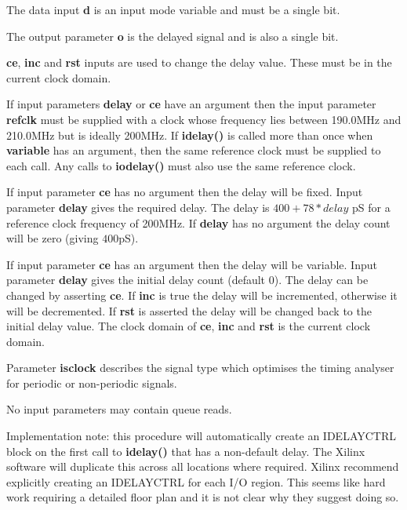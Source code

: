             The data input {\bf d} is an input mode variable and must be a
            single bit.

            The output parameter {\bf o} is the delayed signal and is also a
            single bit.
            
            {\bf ce}, {\bf inc} and {\bf rst} inputs are used to change the
            delay value. These must be in the current clock domain.
            
            If input parameters {\bf delay} or {\bf ce} have an argument then
            the input parameter {\bf refclk} must be supplied with a clock whose
            frequency lies between 190.0MHz and 210.0MHz but is ideally 200MHz.
            If {\bf idelay()} is called more than once when {\bf variable} has
            an argument, then the same reference clock must be supplied to each
            call. Any calls to {\bf iodelay()} must also use the same reference
            clock.
            
            If input parameter {\bf ce} has no argument then the delay will be
            fixed. Input parameter {\bf delay} gives the required delay. The
            delay is $400 + 78 * delay$ pS for a reference clock frequency of
            200MHz. If {\bf delay} has no argument the delay count will be zero
            (giving $400$pS).
            
            If input parameter {\bf ce} has an argument then the delay will be
            variable. Input parameter {\bf delay} gives the initial delay count
            (default 0). The delay can be changed by asserting {\bf ce}. If {\bf
            inc} is true the delay will be incremented, otherwise it will be
            decremented. If {\bf rst} is asserted the delay will be changed back
            to the initial delay value. The clock domain of {\bf ce}, {\bf inc}
            and {\bf rst} is the current clock domain.
            
            Parameter {\bf isclock} describes the signal type which optimises
            the timing analyser for periodic or non-periodic signals.
            
            No input parameters may contain queue reads.
            
            Implementation note: this procedure will automatically create an
            IDELAYCTRL block on the first call to {\bf idelay()} that has a
            non-default delay. The Xilinx software will duplicate this across
            all locations where required. Xilinx recommend explicitly creating
            an IDELAYCTRL for each I/O region. This seems like hard work
            requiring a detailed floor plan and it is not clear why they suggest
            doing so.
            


